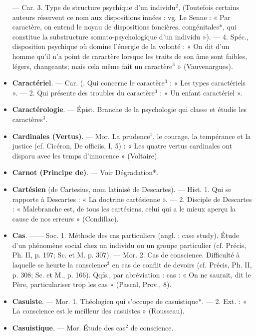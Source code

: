 \begin{itemize}[leftmargin=1cm, label=, itemsep=11pt]
— Car. 3. Type de structure psychique d’un individu$^2$, (Toutefois
certains auteurs réservent ce nom
aux dispositions innées : vg. Le
Senne : « Par caractère, on entend
le noyau de dispositions foncières,
congénitales*, qui constitue la substructure somato-psychologique d’un
individu »). — 4. Spéc., disposition
psychique où domine l'énergie de
la volonté : « On dit d’un homme
qu’il n’a point de caractère lorsque
les traits de son âme sont faibles,
légers, changeants; mais cela même
fait un caractère$^3$ » (Vauvenargues).

\item {\bf Caractériel}. — Car. (. Qui concerne le
caractère$^3$ : « Les types caractériels ». — 2. Qui présente des troubles
du caractère$^3$ : « Un enfant caractériel ».

\item {\bf Caractérologie}. — Épist. Branche de la
psychologie qui classe et étudie les
caractères$^3$.

\item {\bf Cardinales (Vertus)}. — Mor. La prudence$^1$, le courage, la tempérance
et la justice (cf. Cicéron, De officiis,
I, 5) : « Les quatre vertus cardinales
ont disparu avec les temps d’innocence » (Voltaire).

\item {\bf Carnot (Principe de)}. — Voir Dégradation*.

\item {\bf Cartésien} (de Cartesius, nom latinisé
de Descartes). — Hist. 1. Qui se
rapporte à Descartes : « La doctrine
cartésienne ». — 2. Disciple de Descartes : « Malebranche est, de tous
les cartésiens, celui qui a le mieux
aperçu la cause de nos erreurs »
(Condillac).

\item {\bf Cas}. —— Soc. 1. Méthode des cas particuliers (angl. : case study). Étude
d’un phénomène social chez un individu ou un groupe particulier (cf.
Précis, Ph. II, p. 197; Sc. et M.
p. 307). — Mor. 2. Cas de conscience.
Difficulté à laquelle se heurte la
conscience$^3$ en cas de conflit de
devoirs (cf. Précis, Ph. II, p. 308;
Sc. et M., p. 166). Qqfs., par abréviation : cas : « On ne saurait, dit le
Père, particulariser trop les cas »
(Pascal, Prov., 8).

\item {\bf Casuiste}. — Mor. 1. Théologien qui
s'occupe de casuistique*. — 2. Ext. :
« La conscience est le meilleur des
casuistes » (Rousseau).

\item {\bf Casuistique}. — Mor. Étude des cas$^2$
de conscience.


\end{itemize}
